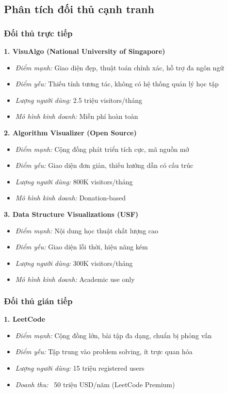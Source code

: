\subsection{Phân tích đối thủ cạnh tranh}
\label{subsec:competitor-analysis}

\subsubsection{Đối thủ trực tiếp}

\textbf{1. VisuAlgo (National University of Singapore)}
\begin{itemize}
\item \textit{Điểm mạnh:} Giao diện đẹp, thuật toán chính xác, hỗ trợ đa ngôn ngữ
\item \textit{Điểm yếu:} Thiếu tính tương tác, không có hệ thống quản lý học tập
\item \textit{Lượng người dùng:} 2.5 triệu visitors/tháng
\item \textit{Mô hình kinh doanh:} Miễn phí hoàn toàn
\end{itemize}

\textbf{2. Algorithm Visualizer (Open Source)}
\begin{itemize}
\item \textit{Điểm mạnh:} Cộng đồng phát triển tích cực, mã nguồn mở
\item \textit{Điểm yếu:} Giao diện đơn giản, thiếu hướng dẫn có cấu trúc
\item \textit{Lượng người dùng:} 800K visitors/tháng
\item \textit{Mô hình kinh doanh:} Donation-based
\end{itemize}

\textbf{3. Data Structure Visualizations (USF)}
\begin{itemize}
\item \textit{Điểm mạnh:} Nội dung học thuật chất lượng cao
\item \textit{Điểm yếu:} Giao diện lỗi thời, hiệu năng kém
\item \textit{Lượng người dùng:} 300K visitors/tháng
\item \textit{Mô hình kinh doanh:} Academic use only
\end{itemize}

\subsubsection{Đối thủ gián tiếp}

\textbf{1. LeetCode}
\begin{itemize}
\item \textit{Điểm mạnh:} Cộng đồng lớn, bài tập đa dạng, chuẩn bị phỏng vấn
\item \textit{Điểm yếu:} Tập trung vào problem solving, ít trực quan hóa
\item \textit{Lượng người dùng:} 15 triệu registered users
\item \textit{Doanh thu:} ~50 triệu USD/năm (LeetCode Premium)
\end{itemize}

